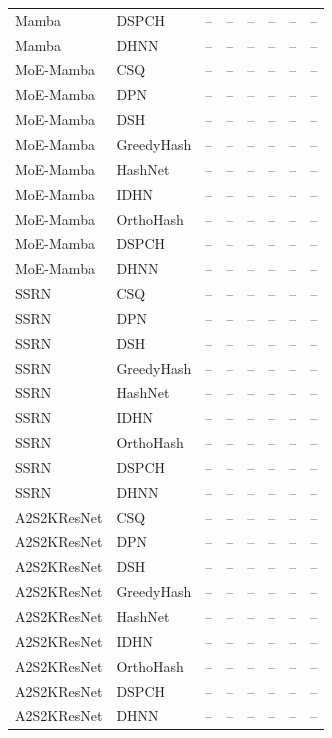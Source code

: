 \begin{longtable}{llrrrrrr}
Mamba & DSPCH & -- & -- & -- & -- & -- & -- \\
Mamba & DHNN & -- & -- & -- & -- & -- & -- \\
\addlinespace
MoE-Mamba & CSQ & -- & -- & -- & -- & -- & -- \\
MoE-Mamba & DPN & -- & -- & -- & -- & -- & -- \\
MoE-Mamba & DSH & -- & -- & -- & -- & -- & -- \\
MoE-Mamba & GreedyHash & -- & -- & -- & -- & -- & -- \\
MoE-Mamba & HashNet & -- & -- & -- & -- & -- & -- \\
MoE-Mamba & IDHN & -- & -- & -- & -- & -- & -- \\
MoE-Mamba & OrthoHash & -- & -- & -- & -- & -- & -- \\
MoE-Mamba & DSPCH & -- & -- & -- & -- & -- & -- \\
MoE-Mamba & DHNN & -- & -- & -- & -- & -- & -- \\
\addlinespace
SSRN & CSQ & -- & -- & -- & -- & -- & -- \\
SSRN & DPN & -- & -- & -- & -- & -- & -- \\
SSRN & DSH & -- & -- & -- & -- & -- & -- \\
SSRN & GreedyHash & -- & -- & -- & -- & -- & -- \\
SSRN & HashNet & -- & -- & -- & -- & -- & -- \\
SSRN & IDHN & -- & -- & -- & -- & -- & -- \\
SSRN & OrthoHash & -- & -- & -- & -- & -- & -- \\
SSRN & DSPCH & -- & -- & -- & -- & -- & -- \\
SSRN & DHNN & -- & -- & -- & -- & -- & -- \\
\addlinespace
A2S2KResNet & CSQ & -- & -- & -- & -- & -- & -- \\
A2S2KResNet & DPN & -- & -- & -- & -- & -- & -- \\
A2S2KResNet & DSH & -- & -- & -- & -- & -- & -- \\
A2S2KResNet & GreedyHash & -- & -- & -- & -- & -- & -- \\
A2S2KResNet & HashNet & -- & -- & -- & -- & -- & -- \\
A2S2KResNet & IDHN & -- & -- & -- & -- & -- & -- \\
A2S2KResNet & OrthoHash & -- & -- & -- & -- & -- & -- \\
A2S2KResNet & DSPCH & -- & -- & -- & -- & -- & -- \\
A2S2KResNet & DHNN & -- & -- & -- & -- & -- & -- \\

\end{longtable}
